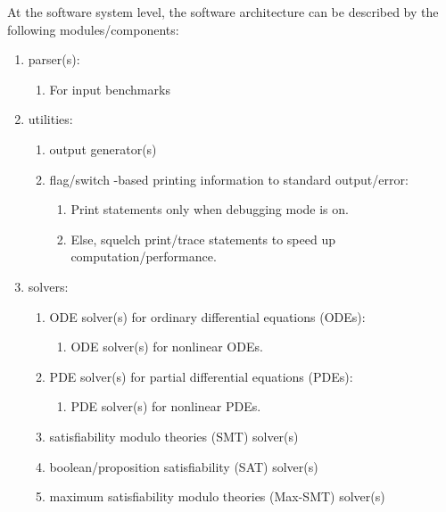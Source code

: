 \documentclass[letter,12pt]{article}
\begin{document}
At the software system level, the software architecture can be described by the following modules/components: \vspace{-0.3cm}
\begin{enumerate} \itemsep -4pt
\item parser(s): \vspace{-0.3cm}
	\begin{enumerate} \itemsep -2pt
	\item For input benchmarks
	\end{enumerate}
\item utilities: \vspace{-0.3cm}
	\begin{enumerate} \itemsep -2pt
	\item output generator(s)
	\item flag/switch -based printing information to standard output/error: \vspace{-0.2cm}
		\begin{enumerate} \itemsep -2pt
		\item Print statements only when debugging mode is on.
		\item Else, squelch print/trace statements to speed up computation/performance.
		\end{enumerate}
	\end{enumerate}
\item solvers: \vspace{-0.3cm}
	\begin{enumerate} \itemsep -2pt
	\item ODE solver(s) for ordinary differential equations (ODEs): \vspace{-0.2cm}
		\begin{enumerate} \itemsep -2pt
		\item ODE solver(s) for nonlinear ODEs.
		\end{enumerate}
	\item PDE solver(s) for partial differential equations (PDEs): \vspace{-0.2cm}
		\begin{enumerate} \itemsep -2pt
		\item PDE solver(s) for nonlinear PDEs.
		\end{enumerate}
	\item satisfiability modulo theories (SMT) solver(s)
	\item boolean/proposition satisfiability (SAT) solver(s)
	\item maximum satisfiability modulo theories (Max-SMT) solver(s)

\end{enumerate}
\end{enumerate}
\end{document}
